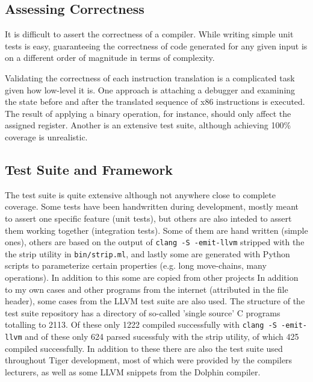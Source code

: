 \documentclass{article}
\begin{document}



%

\subsection{Assessing Correctness}
It is difficult to assert the correctness of a compiler. While writing simple unit tests is easy, guaranteeing the correctness of code generated for any given input is on a different order of magnitude in terms of complexity.

Validating the correctness of each instruction translation is a complicated task given how low-level it is. One approach is attaching a debugger and examining the state before and after the translated sequence of x86 instructions is executed. The result of applying a binary operation,  for instance, should only affect the assigned register. Another is an extensive test suite, although achieving 100\% coverage is unrealistic.

\subsection{Test Suite and  Framework}

The test suite is quite extensive although not anywhere close to complete coverage.
Some tests have been handwritten during development, mostly meant to assert one specific feature (unit tests), but others are also inteded to assert them working together (integration tests). Some of them are hand written (simple ones), others are based on the output of \texttt{clang -S -emit-llvm} stripped with the the strip utility in \texttt{bin/strip.ml}, and lastly some are generated with Python scripts to parameterize certain properties (e.g. long move-chains, many operations). In addition to this some are copied from other projects
In addition to my own cases and other programs from the internet (attributed in the file header), some cases from the LLVM test suite are also used. The structure of the test suite repository has a directory of so-called 'single source' C programs totalling to 2113. Of these only 1222 compiled successfully with \texttt{clang -S -emit-llvm} and of these only 624 parsed sucessfuly with the strip utility, of which 425 compiled successfully. In addition to these there are also the test suite used throughout Tiger development, most of which were provided by the compilers lecturers, as well as some LLVM snippets from the Dolphin compiler.
\end{document}
